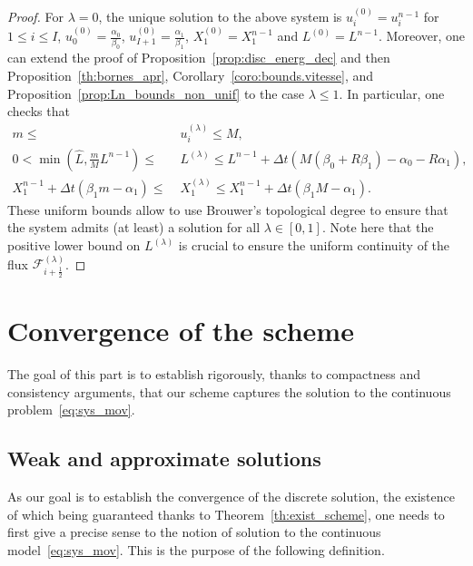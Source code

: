 \documentclass{amsart}
\newcommand\dt{\Delta t}
\newcommand\Ff{{\mathcal F}}
\begin{document}
\begin{proof}
For $\lambda = 0$, the unique solution to the above system is $u_i^{{(0)}} = u_i^{n-1}$ for $1 \leq i \leq I$, $u_0^{(0)} = \frac{\alpha_0}{\beta_0}$, $u_{I+1}^{(0)} = \frac{\alpha_1}{\beta_1}$, $X_1^{(0)} = X_1^{n-1}$ and $L^{(0)}= L^{n-1}$. Moreover, one can extend the proof of Proposition~\ref{prop:disc_energ_dec} and then Proposition~\ref{th:bornes_apr}, Corollary~\ref{coro:bounds.vitesse}, and Proposition~\ref{prop:Ln_bounds_non_unif} to the case $\lambda \leq 1$.
In particular, one checks that 
\begin{align*}
m \leq\; & u_i^{(\lambda)} \leq M, \\ 0 < \min\left( \hat L, \frac{m}M L^{n-1}\right) \leq\; & L^{(\lambda)} \leq L^{n-1} + \dt ( M(\beta_0 + R \beta_1) - \alpha_0 - R\alpha_1), \\
 X_1^{n-1} + \dt \left( \beta_1 m - \alpha_1 \right) \leq\; & X_1^{(\lambda)} \leq X_1^{n-1} + \dt \left( \beta_1 M - \alpha_1 \right).
\end{align*}
These uniform bounds allow to use Brouwer's topological degree to ensure that the system admits (at least) a solution for all $\lambda \in [0,1]$. 
Note here that the positive lower bound on $L^{(\lambda)}$ is crucial to ensure the uniform continuity of the flux $\Ff_{i+\frac12}^{(\lambda)}$. 
		\end{proof}

\section{Convergence of the scheme} \label{sec:conv}

The goal of this part is to establish rigorously, thanks to compactness and consistency arguments, that our scheme captures 
the solution to the continuous problem~\eqref{eq:sys_mov}. 

	
		\subsection{Weak and approximate solutions} \label{sec:weak}

As our goal is to establish the convergence of the discrete solution, the existence of which being guaranteed thanks to Theorem~\ref{th:exist_scheme}, one needs to first give a precise sense to the notion of solution to the continuous model~\eqref{eq:sys_mov}. This is the purpose of the following definition. 
\end{document}
